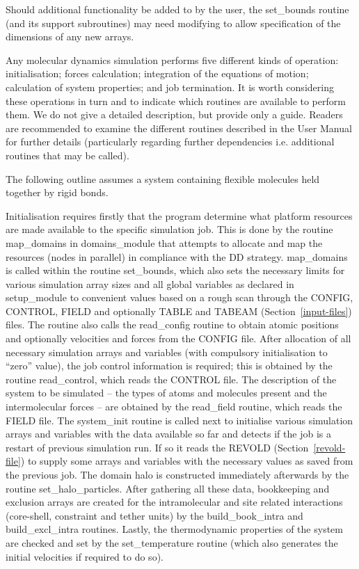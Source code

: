 Should additional functionality be added to \D by the user, the
{\sc set\_bounds} routine (and its support subroutines) may need
modifying to allow specification of the dimensions of any new
arrays.

Any molecular dynamics simulation performs five different kinds of
operation: initialisation; forces calculation; integration of the
equations of motion; calculation of system properties; and job
termination.  It is worth considering these operations in turn and
to indicate which \D routines are available to perform them.  We do
not give a detailed description, but provide only a guide.  Readers
are recommended to examine the different routines described in the
\D User Manual for further details (particularly regarding further
dependencies i.e. additional routines that may be called).

The following outline assumes a system containing flexible molecules
held together by rigid bonds.

Initialisation requires firstly that the program determine what
platform resources are made available to the specific simulation
job.  This is done by the \D routine {\sc map\_domains} in
{\sc domains\_module} that attempts to allocate and map the
resources (nodes in parallel) in compliance with the DD
strategy.  {\sc map\_domains} is called
within the routine {\sc set\_bounds}, which also sets the necessary
limits for various simulation array sizes and all global
variables as declared in {\sc setup\_module} to convenient values
based on a rough scan through the CONFIG, CONTROL, FIELD and optionally
TABLE and TABEAM (Section~\ref{input-files}) files.  The routine also
calls the {\sc read\_config} routine to obtain atomic positions and
optionally velocities and forces from the CONFIG file.  After allocation
of all necessary simulation arrays and variables (with compulsory
initialisation to ``zero'' value), the job control information is
required; this is obtained by the routine {\sc read\_control}, which
reads the CONTROL file.  The description of the system to be
simulated -- the types of atoms and molecules present and the
intermolecular forces -- are obtained by the {\sc read\_field} routine,
which reads the FIELD file.  The {\sc system\_init} routine is
called next to initialise various simulation arrays and variables
with the data available so far and detects if the job is a restart of
previous simulation run.  If so it reads the REVOLD (Section~\ref{revold-file})
to supply some arrays and variables with the
necessary values as saved from the previous job.  The domain halo is
constructed immediately afterwards by the routine {\sc set\_halo\_particles}.
After gathering all these data, bookkeeping and exclusion arrays are
created for the intramolecular and site related interactions
(core-shell, constraint and tether units) by the {\sc build\_book\_intra}
and {\sc build\_excl\_intra} routines.  Lastly, the thermodynamic
properties of the system are checked and set by the
{\sc set\_temperature} routine (which also generates the initial
velocities if required to do so).

